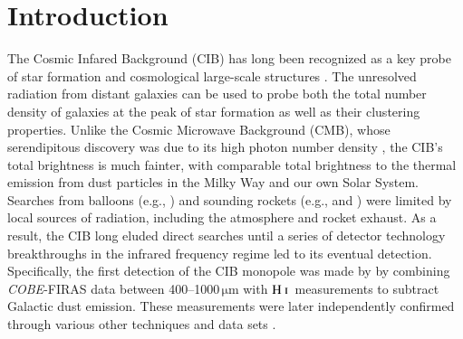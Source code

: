 \documentclass{aa}
\newcommand{\mathsc}[1]{{\normalfont\textsc{#1}}}
\newcommand{\hi}{\ensuremath{\mathsc {H\ i}}}
\def\COBE{\textit{COBE}}
\begin{document}

   \maketitle

   \setcounter{tocdepth}{2}
   \tableofcontents


\section{Introduction}

The Cosmic Infared Background (CIB) has long been recognized as a key probe of star formation and cosmological large-scale structures \citep{partridge1967}. The unresolved radiation from distant galaxies can be used to probe both the total number density of galaxies at the peak of star formation as well as their clustering properties. Unlike the Cosmic Microwave Background (CMB), whose serendipitous discovery was due to its high photon number density \citep{penzias:1965}, the CIB's total brightness is much fainter, with comparable total brightness to the thermal emission from dust particles in the Milky Way and our own Solar System. 
Searches from balloons (e.g., \citealt{hofmann1978}) and sounding rockets (e.g., \citealt{matsumoto1988} and \citealt{noda1992}) were limited by local sources of radiation, including the atmosphere and rocket exhaust.
As a result, the CIB long eluded direct searches until a series of detector technology breakthroughs in the infrared frequency regime led to its eventual detection. Specifically, the first detection of the CIB monopole was made by \citet{puget1996} by combining \COBE-FIRAS data between 400--1000\,$\mathrm{\mu m}$ with \hi\ measurements to subtract Galactic dust emission. These measurements were later independently confirmed through various other techniques and data sets \citep[e.g.,][]{fixsen1998, schlegel1998, lagache:1999, matsumoto:2005, matsuura:2011, penin:2012, tsumura:2013, matsuura:2017}.
\end{document}
